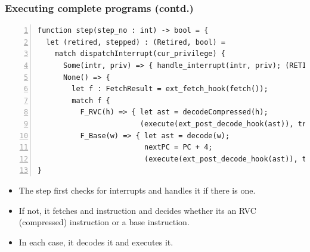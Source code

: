 \documentclass[aspectratio=169]{beamer}
\newcommand{\slidefont}{\scriptsize}
\begin{document}

\begin{frame}[fragile]
  \frametitle{Executing complete programs (contd.)}

  \slidefont

  \begin{Verbatim}[frame=single, numbers=left, label = File riscv\_step.sail]
function step(step_no : int) -> bool = {
  let (retired, stepped) : (Retired, bool) =
    match dispatchInterrupt(cur_privilege) {
      Some(intr, priv) => { handle_interrupt(intr, priv); (RETIRE_FAIL, false) },
      None() => {
        let f : FetchResult = ext_fetch_hook(fetch());
        match f {
          F_RVC(h) => { let ast = decodeCompressed(h);
                        (execute(ext_post_decode_hook(ast)), true) ... }
          F_Base(w) => { let ast = decode(w);
                         nextPC = PC + 4;
                         (execute(ext_post_decode_hook(ast)), true) ... }
}
  \end{Verbatim}

  \begin{minipage}{\textwidth}
    \begin{itemize}
    \item The step first checks for interrupts and handles it if there is one.
    \item If not, it fetches and instruction and decides whether its
      an RVC (compressed) instruction or a base instruction.
    \item In each case, it decodes it and executes it.
    \end{itemize}
  \end{minipage}
\end{frame}


\end{document}
